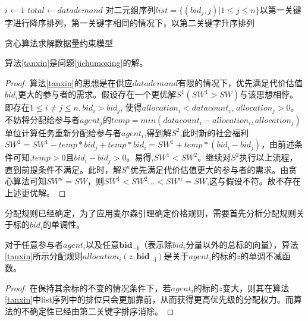 \documentclass[promaster]{thesis-uestc}
\begin{document}
\begin{algorithm}[h] 
    $i \leftarrow 1$\;
    $total \leftarrow datademand $\;
    对二元组序列$list = \{(bid_j,j)|1 \leq j \leq n\}$以第一关键字进行降序排列，第一关键字相同的情况下，以第二关键字升序排列\;
\caption{贪心算法求解数据量约束模型}
\label{tanxin}
\end{algorithm}

\begin{theorem}
算法\ref{tanxin}是问题\ref{jichumoxing}的解。
\end{theorem}

\begin{proof}
    算法\ref{tanxin}的思想是在供应$datademand$有限的情况下，优先满足代价估值$bid_i$更大的参与者的需求。假设存在一个更优解$S^1(SW^1 > SW)$与该思想相悖。即存在$1 \leq i \neq j \leq n,bid_i > bid_j$, 使得$allocation_i < datacount_i \text{, } allocation_j > 0$。不妨将分配给参与者$agent_j$的$temp = min(datacount_i - allocation_i,allocation_j)$单位计算任务重新分配给参与者$agent_i$,得到解$S^2$,此时新的社会福利$SW^2= SW^1- temp*bid_j + temp*bid_i=SW^1+temp*(bid_i-bid_j)$，由前述条件可知,$temp > 0$且$bid_i - bid_j > 0$。易得,$SW^1<SW^2 $。继续对$S^2$执行以上流程，直到前提条件不满足。此时，解$S^n$优先满足代价估值更大的参与者的需求。由贪心算法可知$SW^n = SW$，则$SW^1<SW^2...<SW^n=SW$,这与假设不符。故不存在上述更优解。
\end{proof}

分配规则已经确定，为了应用麦尔森引理确定价格规则，需要首先分析分配规则关于标的$bid_i$的单调性。

\begin{theorem}
    对于任意参与者$agent_i$以及任意$\mathbf{bid_{-i}}$（表示除$bid_i$分量以外的总标的向量），算法\ref{tanxin}所示分配规则$allocation_i(z,\mathbf{bid_{-i}})$是关于$agent_i$的标的$z$的单调不减函数。
\end{theorem}

\begin{proof}
   在保持其余标的不变的情况条件下，若$agent_i$的标的$z$变大，则其在算法\ref{tanxin}中list序列中的排位只会更加靠前，从而获得更高优先级的分配权力。而算法的不确定性已经由第二关键字排序消除。
\end{proof}
\end{document}
